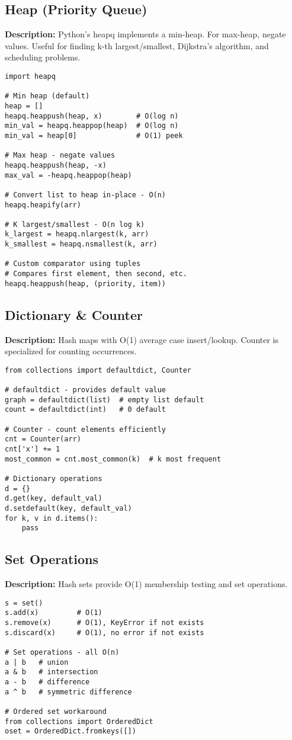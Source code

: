 \subsection{Heap (Priority Queue)}
\textbf{Description:} Python's heapq implements a min-heap. For max-heap, negate values. Useful for finding k-th largest/smallest, Dijkstra's algorithm, and scheduling problems.

\begin{lstlisting}
import heapq

# Min heap (default)
heap = []
heapq.heappush(heap, x)        # O(log n)
min_val = heapq.heappop(heap)  # O(log n)
min_val = heap[0]              # O(1) peek

# Max heap - negate values
heapq.heappush(heap, -x)
max_val = -heapq.heappop(heap)

# Convert list to heap in-place - O(n)
heapq.heapify(arr)

# K largest/smallest - O(n log k)
k_largest = heapq.nlargest(k, arr)
k_smallest = heapq.nsmallest(k, arr)

# Custom comparator using tuples
# Compares first element, then second, etc.
heapq.heappush(heap, (priority, item))
\end{lstlisting}

\subsection{Dictionary \& Counter}
\textbf{Description:} Hash maps with O(1) average case insert/lookup. Counter is specialized for counting occurrences.

\begin{lstlisting}
from collections import defaultdict, Counter

# defaultdict - provides default value
graph = defaultdict(list)  # empty list default
count = defaultdict(int)   # 0 default

# Counter - count elements efficiently
cnt = Counter(arr)
cnt['x'] += 1
most_common = cnt.most_common(k)  # k most frequent

# Dictionary operations
d = {}
d.get(key, default_val)
d.setdefault(key, default_val)
for k, v in d.items():
    pass
\end{lstlisting}

\subsection{Set Operations}
\textbf{Description:} Hash sets provide O(1) membership testing and set operations.

\begin{lstlisting}
s = set()
s.add(x)         # O(1)
s.remove(x)      # O(1), KeyError if not exists
s.discard(x)     # O(1), no error if not exists

# Set operations - all O(n)
a | b   # union
a & b   # intersection
a - b   # difference
a ^ b   # symmetric difference

# Ordered set workaround
from collections import OrderedDict
oset = OrderedDict.fromkeys([])
\end{lstlisting}
